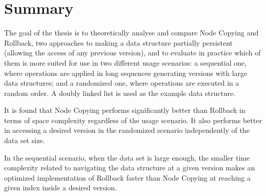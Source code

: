 \chapter{Summary}

The goal of the thesis is to theoretically analyse and compare Node Copying and
Rollback, two approaches to making a data structure partially persistent
(allowing the access of any previous version), and to evaluate in practice which
of them is more suited for use in two different usage scenarios: a sequential
one, where operations are applied in long sequences generating versions with
large data structures; and a randomized one, where operations are executed in a
random order. A doubly linked list is used as the example data structure.

It is found that Node Copying performs significantly better than Rollback in
terms of space complexity regardless of the usage scenario. It also performs
better in accessing a desired version in the randomized scenario independently
of the data set size.

In the sequential scenario, when the data set is large enough, the smaller time
complexity related to navigating the data structure at a given version makes an
optimized implementation of Rollback faster than Node Copying at reaching a
given index inside a desired version.
